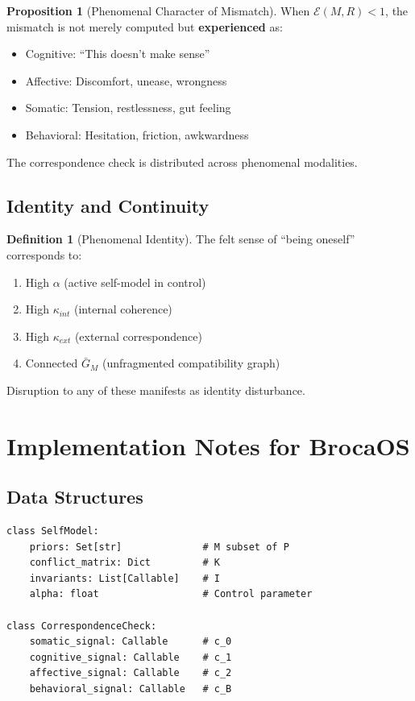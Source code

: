 \documentclass[12pt,a4paper]{article}
\theoremstyle{definition}
\newtheorem{definition}{Definition}[section]
\newtheorem{proposition}{Proposition}[section]
\begin{document}
\begin{proposition}[Phenomenal Character of Mismatch]
When $\mathcal{E}(M, R) < 1$, the mismatch is not merely computed but \textbf{experienced} as:
\begin{itemize}
    \item Cognitive: ``This doesn't make sense''
    \item Affective: Discomfort, unease, wrongness
    \item Somatic: Tension, restlessness, gut feeling
    \item Behavioral: Hesitation, friction, awkwardness
\end{itemize}
The correspondence check is distributed across phenomenal modalities.
\end{proposition}

\subsection{Identity and Continuity}

\begin{definition}[Phenomenal Identity]
The felt sense of ``being oneself'' corresponds to:
\begin{enumerate}
    \item High $\alpha$ (active self-model in control)
    \item High $\kappa_{int}$ (internal coherence)
    \item High $\kappa_{ext}$ (external correspondence)
    \item Connected $\bar{G}_M$ (unfragmented compatibility graph)
\end{enumerate}
Disruption to any of these manifests as identity disturbance.
\end{definition}

\section{Implementation Notes for BrocaOS}

\subsection{Data Structures}

\begin{verbatim}
class SelfModel:
    priors: Set[str]              # M subset of P
    conflict_matrix: Dict         # K
    invariants: List[Callable]    # I
    alpha: float                  # Control parameter
    
class CorrespondenceCheck:
    somatic_signal: Callable      # c_0
    cognitive_signal: Callable    # c_1
    affective_signal: Callable    # c_2
    behavioral_signal: Callable   # c_B
\end{verbatim}
\end{document}
